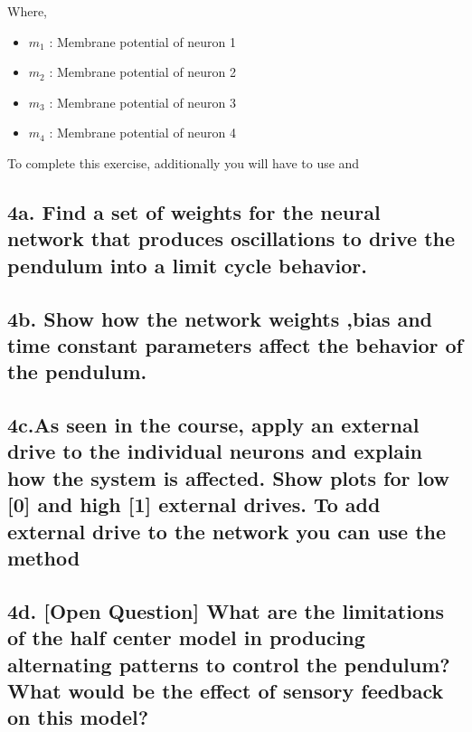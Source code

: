 \documentclass{cmc}
\begin{document}
Where,

\begin{itemize}
\item $m_1$ : Membrane potential of neuron 1
\item $m_2$ : Membrane potential of neuron 2
\item $m_3$ : Membrane potential of neuron 3
\item $m_4$ : Membrane potential of neuron 4
\end{itemize}

To complete this exercise, additionally you will have to use
 and 

\subsection*{4a. Find a set of weights for the neural network that
  produces oscillations to drive the pendulum into a limit cycle
  behavior.}
\label{sec:4a}

\subsection*{4b. Show how the network weights ,bias and time constant
  parameters affect the behavior of the pendulum.}
\label{sec:4b}

\subsection*{4c.As seen in the course, apply an external drive to the
  individual neurons and explain how the system is affected. Show
  plots for low [0] and high [1] external drives. To add external
  drive to the network you can use the method \\
   }
\label{sec:4c}

\subsection*{4d. [Open Question] What are the limitations of the half center model in
  producing alternating patterns to control the pendulum? What would
  be the effect of sensory feedback on this model?}
\label{sec:4d}
\end{document}
